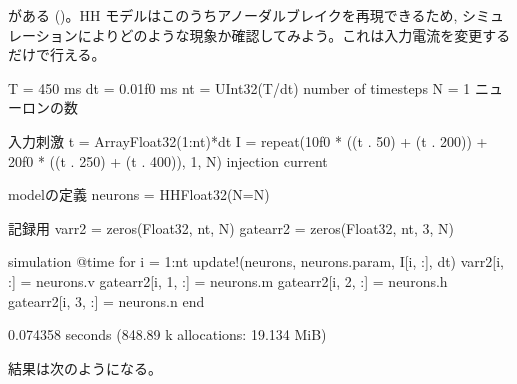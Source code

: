 \documentclass[letterpaper,10pt,english]{sphinxmanual}
\begin{document}
がある ()。HH モデルはこのうちアノーダルブレイクを再現できるため, シミュレーションによりどのような現象か確認してみよう。これは入力電流を変更するだけで行える。

\begin{sphinxVerbatim}[commandchars=\\\{\}]
T = 450 \PYGZsh{} ms
dt = 0.01f0 \PYGZsh{} ms
nt = UInt32(T/dt) \PYGZsh{} number of timesteps
N = 1 \PYGZsh{} ニューロンの数

\PYGZsh{} 入力刺激
t = Array\PYGZob{}Float32\PYGZcb{}(1:nt)*dt
I = repeat(10f0 * (\PYGZhy{}(t .\PYGZgt{} 50) + (t .\PYGZgt{} 200)) + 20f0 * (\PYGZhy{}(t .\PYGZgt{} 250) + (t .\PYGZgt{} 400)), 1, N)  \PYGZsh{} injection current

\PYGZsh{} modelの定義
neurons = HH\PYGZob{}Float32\PYGZcb{}(N=N)

\PYGZsh{} 記録用
varr2 = zeros(Float32, nt, N)
gatearr2 = zeros(Float32, nt, 3, N)

\PYGZsh{} simulation
@time for i = 1:nt
    update!(neurons, neurons.param, I[i, :], dt)
    varr2[i, :] = neurons.v
    gatearr2[i, 1, :] = neurons.m
    gatearr2[i, 2, :] = neurons.h
    gatearr2[i, 3, :] = neurons.n
end
\end{sphinxVerbatim}

\begin{sphinxVerbatim}[commandchars=\\\{\}]
  0.074358 seconds (848.89 k allocations: 19.134 MiB)
\end{sphinxVerbatim}

結果は次のようになる。
\end{document}
